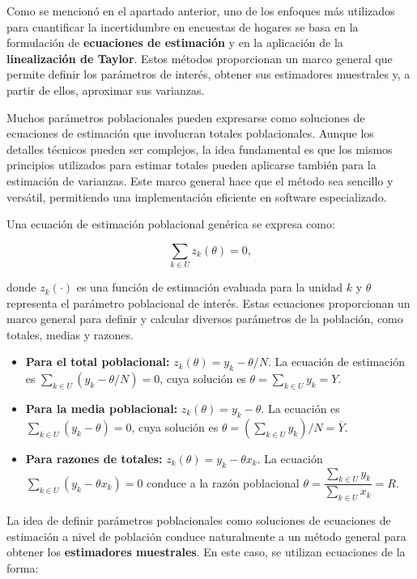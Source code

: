 \documentclass[
  12pt,
]{book}
\begin{document}
Como se mencionó en el apartado anterior, uno de los enfoques más utilizados para cuantificar la incertidumbre en encuestas de hogares se basa en la formulación de \textbf{ecuaciones de estimación} y en la aplicación de la \textbf{linealización de Taylor}. Estos métodos proporcionan un marco general que permite definir los parámetros de interés, obtener sus estimadores muestrales y, a partir de ellos, aproximar sus varianzas.

Muchos parámetros poblacionales pueden expresarse como soluciones de ecuaciones de estimación que involucran totales poblacionales. Aunque los detalles técnicos pueden ser complejos, la idea fundamental es que los mismos principios utilizados para estimar totales pueden aplicarse también para la estimación de varianzas. Este marco general hace que el método sea sencillo y versátil, permitiendo una implementación eficiente en software especializado.

Una ecuación de estimación poblacional genérica se expresa como:

\[
\sum_{k\in U} z_k(\theta)=0,
\]

donde \(z_k(\cdot)\) es una función de estimación evaluada para la unidad \(k\) y \(\theta\) representa el parámetro poblacional de interés. Estas ecuaciones proporcionan un marco general para definir y calcular diversos parámetros de la población, como totales, medias y razones.

\begin{itemize}
\item
  \textbf{Para el total poblacional:}
  \(z_k(\theta)=y_k-\theta/N\). La ecuación de estimación es \(\sum_{k\in U}(y_k-\theta/N)=0\), cuya solución es \(\theta=\sum_{k\in U} y_k = Y\).
\item
  \textbf{Para la media poblacional:}
  \(z_k(\theta)=y_k-\theta\). La ecuación es \(\sum_{k\in U}(y_k-\theta)=0\), cuya solución es \(\theta=\left(\sum_{k\in U} y_k\right)/N = \overline{Y}\).
\item
  \textbf{Para razones de totales:}
  \(z_k(\theta)=y_k-\theta x_k\). La ecuación \(\sum_{k\in U}(y_k-\theta x_k)=0\) conduce a la razón poblacional \(\theta=\dfrac{\sum_{k\in U} y_k}{\sum_{k\in U} x_k} = R\).
\end{itemize}

La idea de definir parámetros poblacionales como soluciones de ecuaciones de estimación a nivel de población conduce naturalmente a un método general para obtener los \textbf{estimadores muestrales}. En este caso, se utilizan ecuaciones de la forma:
\end{document}
